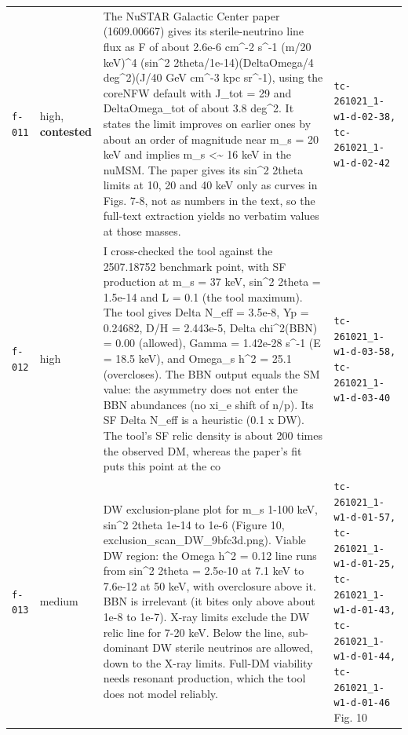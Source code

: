 \documentclass[11pt,a4paper]{article}
\begin{document}
\begin{longtable}{@{}p{}p{}p{}p{}@{}}
\texttt{f-011} & high, \textbf{contested} & The NuSTAR Galactic Center paper (1609.00667) gives its sterile-neutrino line flux as F of about 2.6e-6 cm\textasciicircum{}-2 s\textasciicircum{}-1 (m/20 keV)\textasciicircum{}4 (sin\textasciicircum{}2 2theta/1e-14)(DeltaOmega/4 deg\textasciicircum{}2)(J/40 GeV cm\textasciicircum{}-3 kpc sr\textasciicircum{}-1), using the coreNFW default with J\_tot = 29 and DeltaOmega\_tot of about 3.8 deg\textasciicircum{}2. It states the limit improves on earlier ones by about an order of magnitude near m\_s = 20 keV and implies m\_s \textless{}\textasciitilde{} 16 keV in the nuMSM. The paper gives its sin\textasciicircum{}2 2theta limits at 10, 20 and 40 keV only as curves in Figs. 7-8, not as numbers in the text, so the full-text extraction yields no verbatim values at those masses. & \texttt{tc-261021\_\allowbreak{}1-w1-d-02-38,\allowbreak{} tc-261021\_\allowbreak{}1-w1-d-02-42} \\
\texttt{f-012} & high & I cross-checked the tool against the 2507.18752 benchmark point, with SF production at m\_s = 37 keV, sin\textasciicircum{}2 2theta = 1.5e-14 and L = 0.1 (the tool maximum). The tool gives Delta N\_eff = 3.5e-8, Yp = 0.24682, D/H = 2.443e-5, Delta chi\textasciicircum{}2(BBN) = 0.00 (allowed), Gamma = 1.42e-28 s\textasciicircum{}-1 (E = 18.5 keV), and Omega\_s h\textasciicircum{}2 = 25.1 (overcloses). The BBN output equals the SM value: the asymmetry does not enter the BBN abundances (no xi\_e shift of n/p). Its SF Delta N\_eff is a heuristic (0.1 x DW). The tool's SF relic density is about 200 times the observed DM, whereas the paper's fit puts this point at the co & \texttt{tc-261021\_\allowbreak{}1-w1-d-03-58,\allowbreak{} tc-261021\_\allowbreak{}1-w1-d-03-40} \\
\texttt{f-013} & medium & DW exclusion-plane plot for m\_s 1-100 keV, sin\textasciicircum{}2 2theta 1e-14 to 1e-6 (Figure 10, exclusion\_scan\_DW\_9bfc3d.png). Viable DW region: the Omega h\textasciicircum{}2 = 0.12 line runs from sin\textasciicircum{}2 2theta = 2.5e-10 at 7.1 keV to 7.6e-12 at 50 keV, with overclosure above it. BBN is irrelevant (it bites only above about 1e-8 to 1e-7). X-ray limits exclude the DW relic line for 7-20 keV. Below the line, sub-dominant DW sterile neutrinos are allowed, down to the X-ray limits. Full-DM viability needs resonant production, which the tool does not model reliably. & \texttt{tc-261021\_\allowbreak{}1-w1-d-01-57,\allowbreak{} tc-261021\_\allowbreak{}1-w1-d-01-25,\allowbreak{} tc-261021\_\allowbreak{}1-w1-d-01-43,\allowbreak{} tc-261021\_\allowbreak{}1-w1-d-01-44,\allowbreak{} tc-261021\_\allowbreak{}1-w1-d-01-46} Fig. 10 \\

\end{longtable}
\end{document}
